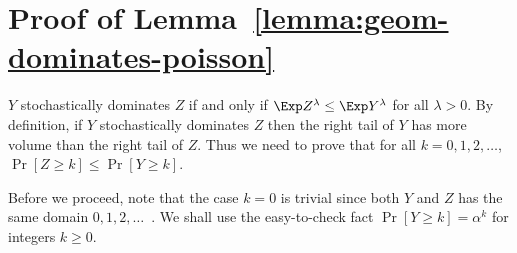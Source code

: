 \section{Proof of Lemma~\ref{lemma:geom-dominates-poisson}}



    $Y$ stochastically dominates $Z$ if and only if $\Exp Z^\lambda \leq \Exp Y^\lambda$ 
    for all $\lambda > 0$. 
    By definition, if $Y$ stochastically dominates $Z$ then the right tail of $Y$ 
    has more volume than the right tail of $Z$.
    Thus we need to prove that for all $k = 0, 1, 2, \ldots$, $\Pr[Z \geq k] \leq \Pr[Y \geq k]$.

    Before we proceed, note that the case $k = 0$ is trivial since 
    both $Y$ and $Z$ has the same domain $0, 1, 2, \ldots$\ . 
    We shall use the easy-to-check fact $\Pr[Y \geq k] = \alpha^k$ for integers $k \geq 0$. 

